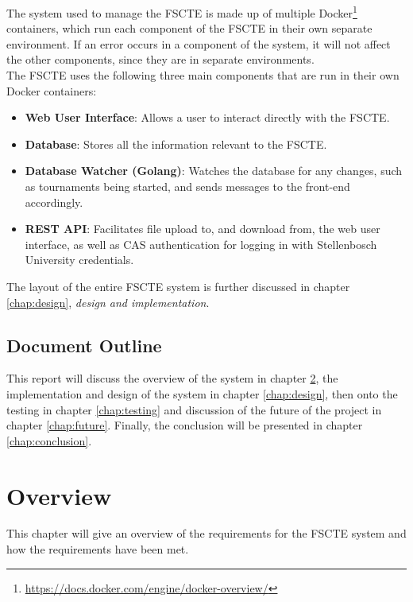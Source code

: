 \documentclass[a4paper, 11pt]{report}
\begin{document}
The system used to manage the FSCTE is made up of multiple Docker\footnote{\url{https://docs.docker.com/engine/docker-overview/}}
containers, which run each component of the FSCTE in their own separate environment.
If an error occurs in a component of the system, it will not affect the other
components, since they are in separate environments. \\

The FSCTE uses the following three main components that are run in their own
Docker containers:

\begin{itemize}
	\item \textbf{Web User Interface}: Allows a user to interact directly with
	the FSCTE.
	\item \textbf{Database}: Stores all the information relevant to the FSCTE.
	\item \textbf{Database Watcher (Golang)}: Watches the database for any changes,
	such as tournaments being started, and sends messages to the front-end
	accordingly.
	\item \textbf{REST API}: Facilitates file upload to, and download from, the
	web user interface, as well as CAS authentication for logging in with
	Stellenbosch University credentials.
\end{itemize}

The layout of the entire FSCTE system is further discussed in chapter
\ref{chap:design}, \emph{design and implementation}.

\section{Document Outline}

This report will discuss the overview of the system in chapter \ref{chap:overview},
the implementation and design of the system in chapter \ref{chap:design}, then
onto the testing in chapter \ref{chap:testing} and discussion of the future of
the project in chapter \ref{chap:future}. Finally, the conclusion will be
presented in chapter \ref{chap:conclusion}.

\chapter{Overview}
\label{chap:overview}

This chapter will give an overview of the requirements for the FSCTE system and
how the requirements have been met. \\
\end{document}
